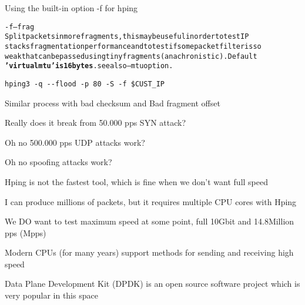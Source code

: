 \documentclass[Screen16to9,17pt]{foils}
\begin{document}
Using the built-in option -f for hping

\begin{alltt}\small
-f --frag
    Split  packets  in more fragments, this may be useful in order to test IP
    stacks fragmentation performance and to test if some packet filter is  so
    weak  that  can  be  passed using tiny fragments (anachronistic). Default
    {\bf 'virtual mtu' is 16 bytes}. see also --mtu option.
\end{alltt}

\begin{list1}
\item \verb+hping3 -q --flood -p 80 -S -f $CUST_IP+
\item Similar process with bad checksum and Bad fragment offset
\end{list1}



\centerline{Really does it break from 50.000 pps SYN attack?}



\centerline{Oh no 500.000 pps UDP attacks work?}


\centerline{Oh no spoofing attacks work?}



\begin{list2}
\item Hping is not the fastest tool, which is fine when we don't want full speed
\item I can produce millions of packets, but it requires multiple CPU cores with Hping
\item We DO want to test maximum speed at some point, full 10Gbit and 14.8Million pps (Mpps)
\item Modern CPUs (for many years) support methods for sending and receiving high speed
\item Data Plane Development Kit (DPDK) is an open source software project which is very popular in this space \\
\end{list2}
\end{document}
